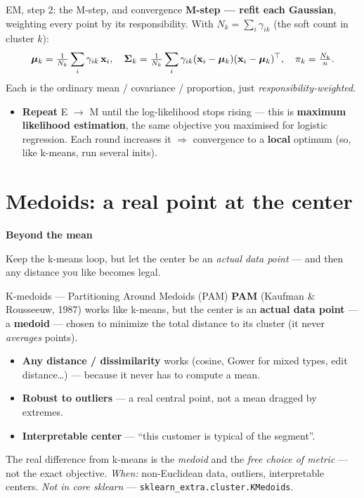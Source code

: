 \documentclass[aspectratio=169]{beamer}
\newcommand{\sectiontransition}[2]{%
  \begin{frame}[plain]
    \vfill
    \begin{center}
      {\Large\color{popblue}\textbf{#1}}\\[0.9em]
      \begin{minipage}{0.82\textwidth}\centering\small #2 \end{minipage}
    \end{center}
    \vfill
  \end{frame}}
\begin{document}
\begin{frame}{EM, step 2: the M-step, and convergence}
  \textbf{M-step --- refit each Gaussian}, weighting every point by its responsibility. With
  $N_k=\sum_i \gamma_{ik}$ (the soft count in cluster $k$):
  \[
    \bm{\mu}_k = \tfrac{1}{N_k}\sum_i \gamma_{ik}\,\mathbf{x}_i, \quad
    \bm{\Sigma}_k = \tfrac{1}{N_k}\sum_i \gamma_{ik}(\mathbf{x}_i-\bm{\mu}_k)(\mathbf{x}_i-\bm{\mu}_k)^\top, \quad
    \pi_k = \tfrac{N_k}{n}.
  \]
  Each is the ordinary mean / covariance / proportion, just \emph{responsibility-weighted}.
  \vfill
  \begin{itemize}\small
    \item \textbf{Repeat} E $\to$ M until the log-likelihood stops rising --- this is
      \textbf{maximum likelihood estimation}, the same objective you maximised for logistic
      regression. Each round increases it $\Rightarrow$ convergence to a \textbf{local} optimum
      (so, like k-means, run several inits).
  \end{itemize}
  \vfill
\end{frame}

\section{Medoids: a real point at the center}
\sectiontransition{Beyond the mean}{Keep the k-means loop, but let the center be an \emph{actual
data point} --- and then any distance you like becomes legal.}

\begin{frame}{K-medoids --- Partitioning Around Medoids (PAM)}
  \textbf{PAM} (Kaufman \& Rousseeuw, 1987) works like k-means, but the center is an \textbf{actual
  data point} --- a \textbf{medoid} --- chosen to minimize the total distance to its cluster (it
  never \emph{averages} points).
  \begin{itemize}\small
    \item \textbf{Any distance / dissimilarity} works (cosine, Gower for mixed types, edit
      distance\dots) --- because it never has to compute a mean.
    \item \textbf{Robust to outliers} --- a real central point, not a mean dragged by extremes.
    \item \textbf{Interpretable center} --- ``this customer is typical of the segment''.
  \end{itemize}
  \vfill
  \footnotesize The real difference from k-means is the \emph{medoid} and the \emph{free choice of
  metric} --- not the exact objective. \emph{When:} non-Euclidean data, outliers, interpretable
  centers. \emph{Not in core sklearn} --- \texttt{sklearn\_extra.cluster.KMedoids}.
\end{frame}
\end{document}
